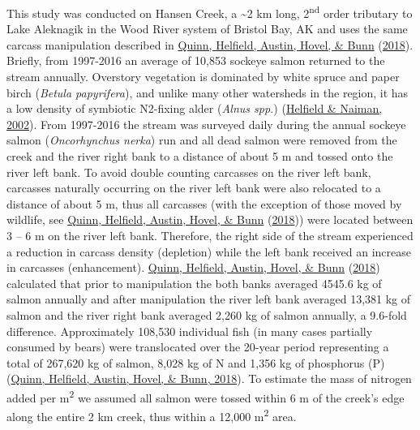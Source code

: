 \documentclass [11pt, proquest] {uwthesis}[2015/03/03]
\begin{document}
This study was conducted on Hansen Creek, a \textasciitilde2 km long, 2\textsuperscript{nd} order tributary to Lake Aleknagik in the Wood River system of Bristol Bay, AK and uses the same carcass manipulation described in \protect\hyperlink{ref-Quinn2018}{Quinn, Helfield, Austin, Hovel, \& Bunn} (\protect\hyperlink{ref-Quinn2018}{2018}). Briefly, from 1997-2016 an average of 10,853 sockeye salmon returned to the stream annually. Overstory vegetation is dominated by white spruce and paper birch (\emph{Betula papyrifera}), and unlike many other watersheds in the region, it has a low density of symbiotic N2-fixing alder (\emph{Alnus spp.}) (\protect\hyperlink{ref-Helfield2002}{Helfield \& Naiman, 2002}). From 1997-2016 the stream was surveyed daily during the annual sockeye salmon (\emph{Oncorhynchus nerka}) run and all dead salmon were removed from the creek and the river right bank to a distance of about 5 m and tossed onto the river left bank. To avoid double counting carcasses on the river left bank, carcasses naturally occurring on the river left bank were also relocated to a distance of about 5 m, thus all carcasses (with the exception of those moved by wildlife, see \protect\hyperlink{ref-Quinn2018}{Quinn, Helfield, Austin, Hovel, \& Bunn} (\protect\hyperlink{ref-Quinn2018}{2018})) were located between 3 -- 6 m on the river left bank. Therefore, the right side of the stream experienced a reduction in carcass density (depletion) while the left bank received an increase in carcasses (enhancement). \protect\hyperlink{ref-Quinn2018}{Quinn, Helfield, Austin, Hovel, \& Bunn} (\protect\hyperlink{ref-Quinn2018}{2018}) calculated that prior to manipulation the both banks averaged 4545.6 kg of salmon annually and after manipulation the river left bank averaged 13,381 kg of salmon and the river right bank averaged 2,260 kg of salmon annually, a 9.6-fold difference. Approximately 108,530 individual fish (in many cases partially consumed by bears) were translocated over the 20-year period representing a total of 267,620 kg of salmon, 8,028 kg of N and 1,356 kg of phosphorus (P) (\protect\hyperlink{ref-Quinn2018}{Quinn, Helfield, Austin, Hovel, \& Bunn, 2018}). To estimate the mass of nitrogen added per m\textsuperscript{2} we assumed all salmon were tossed within 6 m of the creek's edge along the entire 2 km creek, thus within a 12,000 m\textsuperscript{2} area.
\end{document}
